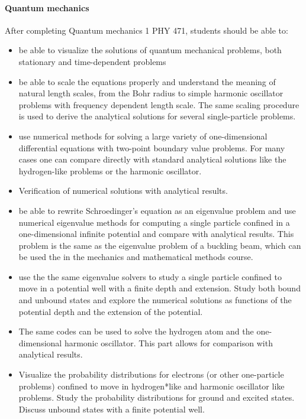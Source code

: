 \paragraph{Quantum mechanics}
After completing Quantum mechanics 1  PHY 471, students should be able to:
\begin{itemize}
\item be able to visualize the solutions of quantum mechanical problems, both stationary and time-dependent problems

\item be able to scale the equations properly and understand the meaning of natural length scales, from the Bohr radius to simple harmonic oscillator problems with frequency dependent length scale. The same scaling procedure is  used to derive the analytical solutions for several single-particle problems.

\item use numerical methods for solving a large variety of one-dimensional differential equations with two-point boundary value problems. For many cases one can compare directly with standard analytical  solutions like the hydrogen-like problems or the harmonic oscillator.

\item Verification of numerical solutions with analytical results.

\item be able to rewrite Schroedinger's equation as an eigenvalue problem and use numerical eigenvalue methods for computing a single particle confined in a one-dimensional infinite potential and compare with analytical results. This problem is the same as the eigenvalue problem of a buckling beam, which can be used the in the mechanics and mathematical methods course.

\item use the the same eigenvalue solvers to study a single particle confined to move in a potential well with a finite depth and extension. Study both bound and unbound states and explore the numerical solutions as functions of the potential depth and the extension of the potential.

\item The same codes can be used to solve the hydrogen atom and the one-dimensional harmonic oscillator. This part allows for comparison with analytical results.

\item Visualize the probability distributions for electrons (or other one-particle problems) confined to move in hydrogen*like and harmonic oscillator like problems. Study the probability distributions for ground and excited states. Discuss unbound states with a finite potential well.


\end{itemize}
